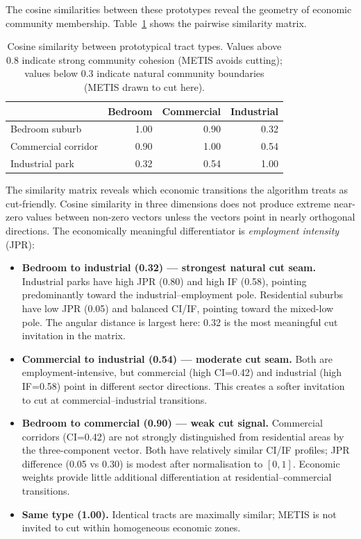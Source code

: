 The cosine similarities between these prototypes reveal the geometry of
economic community membership.
Table~\ref{tab:similarity-matrix} shows the pairwise similarity matrix.

\begin{table}[ht]
\centering
\caption{Cosine similarity between prototypical tract types.
  Values above 0.8 indicate strong community cohesion (METIS avoids cutting);
  values below 0.3 indicate natural community boundaries (METIS drawn to cut here).}
\label{tab:similarity-matrix}
\begin{tabular}{lrrr}
\toprule
 & Bedroom & Commercial & Industrial \\
\midrule
Bedroom suburb     & 1.00 & 0.90 & 0.32 \\
Commercial corridor & 0.90 & 1.00 & 0.54 \\
Industrial park    & 0.32 & 0.54 & 1.00 \\
\bottomrule
\end{tabular}
\end{table}

The similarity matrix reveals which economic transitions the algorithm treats as cut-friendly.
Cosine similarity in three dimensions does not produce extreme near-zero values
between non-zero vectors unless the vectors point in nearly orthogonal directions.
The economically meaningful differentiator is \emph{employment intensity} (JPR):
\begin{itemize}
  \item \textbf{Bedroom to industrial (0.32) --- strongest natural cut seam.}
    Industrial parks have high JPR (0.80) and high IF (0.58), pointing
    predominantly toward the industrial--employment pole.
    Residential suburbs have low JPR (0.05) and balanced CI/IF, pointing
    toward the mixed-low pole.
    The angular distance is largest here: 0.32 is the most meaningful
    cut invitation in the matrix.
  \item \textbf{Commercial to industrial (0.54) --- moderate cut seam.}
    Both are employment-intensive, but commercial (high CI=0.42) and industrial
    (high IF=0.58) point in different sector directions.
    This creates a softer invitation to cut at commercial--industrial transitions.
  \item \textbf{Bedroom to commercial (0.90) --- weak cut signal.}
    Commercial corridors (CI=0.42) are not strongly distinguished from
    residential areas by the three-component vector.
    Both have relatively similar CI/IF profiles; JPR difference (0.05 vs 0.30)
    is modest after normalisation to $[0, 1]$.
    Economic weights provide little additional differentiation at
    residential--commercial transitions.
  \item \textbf{Same type (1.00).}
    Identical tracts are maximally similar; METIS is not invited to cut within
    homogeneous economic zones.
\end{itemize}

